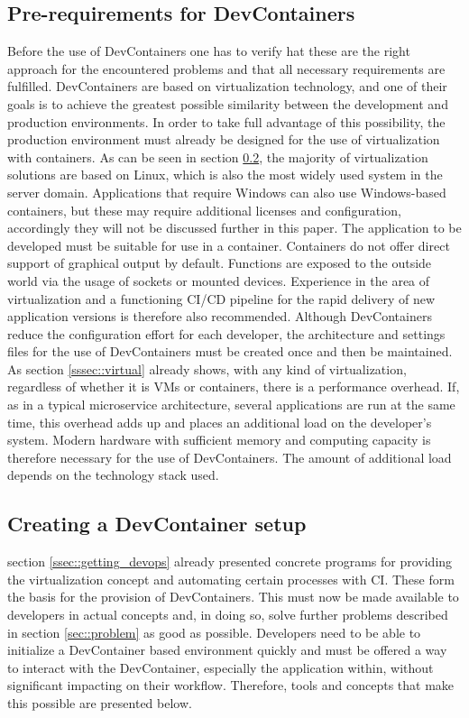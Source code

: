     \subsection{Pre-requirements for DevContainers}
    Before the use of DevContainers one has to verify hat these are the right approach for the encountered problems and that all necessary requirements are fulfilled.\newline
    DevContainers are based on virtualization technology, and one of their goals is to achieve the greatest possible similarity between the development and production environments. In order to take full advantage of this possibility, the production environment must already be designed for the use of virtualization with containers. As can be seen in section \ref{ssec::toolsused}, the majority of virtualization solutions are based on Linux, which is also the most widely used system in the server domain. Applications that require Windows can also use Windows-based containers, but these may require additional licenses and configuration, accordingly they will not be discussed further in this paper. The application to be developed must be suitable for use in a container. Containers do not offer direct support of graphical output by default. Functions are exposed to the outside world via the usage of sockets or mounted devices. Experience in the area of virtualization and a functioning \ac{CI}/\ac{CD} pipeline for the rapid delivery of new application versions is therefore also recommended.\newline
    Although DevContainers reduce the configuration effort for each developer, the architecture and settings files for the use of DevContainers must be created once and then be maintained. As section \ref{sssec::virtual} already shows, with any kind of virtualization, regardless of whether it is VMs or containers, there is a performance overhead. If, as in a typical microservice architecture, several applications are run at the same time, this overhead adds up and places an additional load on the developer's system. Modern hardware with sufficient memory and computing capacity is therefore necessary for the use of DevContainers. The amount of additional load depends on the technology stack used.

    \subsection{Creating a DevContainer setup}\label{ssec::toolsused}
    section \ref{ssec::getting_devops} already presented concrete programs for providing the virtualization concept and automating certain processes with \ac{CI}. These form the basis for the provision of DevContainers. This must now be made available to developers in actual concepts and, in doing so, solve further problems described in section \ref{sec::problem} as good as possible. Developers need to be able to initialize a DevContainer based environment quickly and must be offered a way to interact with the DevContainer, especially the application within, without significant impacting on their workflow. Therefore, tools and concepts that make this possible are presented below.

